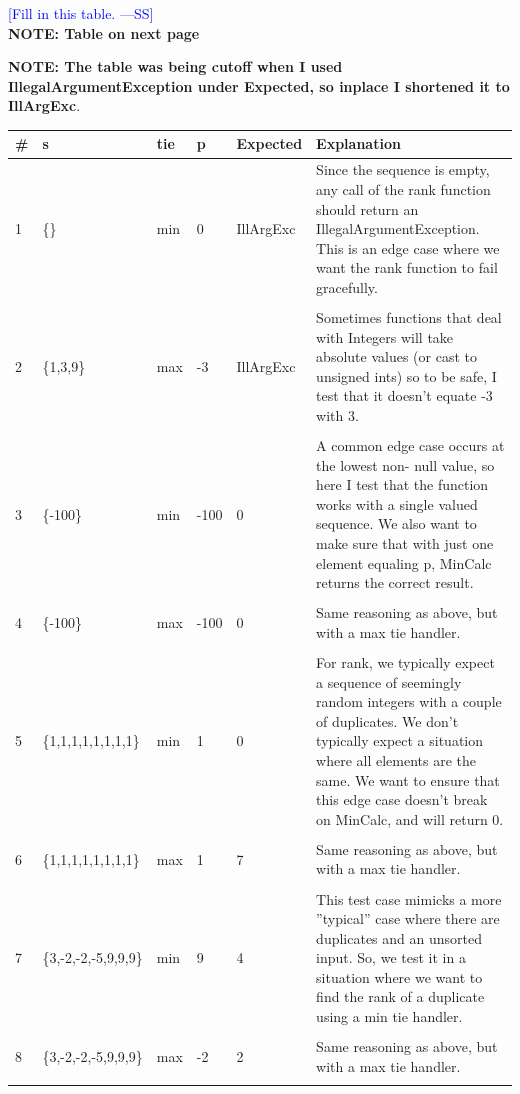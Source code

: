 \documentclass[12pt,fleqn]{examtst}
\newcommand{\authornote}[3]{\textcolor{#1}{[#3 ---#2]}}
\newcommand{\authornote}[3]{}
\newcommand{\wss}[1]{\authornote{blue}{SS}{#1}}
\begin{document}
\wss{Fill in this table.}\\

\textbf{NOTE: Table on next page}


\noindent
\begin{minipage}{\textwidth}

\textbf{NOTE: The table was being cutoff when I used IllegalArgumentException
under Expected, so inplace I shortened it to IllArgExc}.\\

\begin{tabular}{ p{0.75cm}  l  l  l  l p{9cm} }
  \toprule
  \textbf{\#} & \textbf{s} & \textbf{tie} & \textbf{p} & \textbf{Expected} & \textbf{Explanation}\\
  \midrule
  1 & \{\} & min & 0 & IllArgExc & Since the sequence is empty,
  any call of the rank function should return an IllegalArgumentException.
  This is an edge case where we want the rank function to fail gracefully.\\ \\
  2 & \{1,3,9\} & max & -3 & IllArgExc & Sometimes functions that
  deal with Integers will take absolute values (or cast to unsigned ints) so to
  be safe, I test that it doesn't equate -3 with 3.\\ \\
  3 & \{-100\} & min & -100 & 0 & A common edge case occurs at the lowest non-
  null value, so here I test that the function works with a single valued
  sequence. We also want to make sure that with just one element equaling p,
  MinCalc returns the correct result.\\ \\
  4 & \{-100\} & max & -100 & 0 & Same reasoning as above, but with a
  max tie handler.\\ \\
  5 & \{1,1,1,1,1,1,1,1\} & min & 1 & 0 & For rank, we typically expect a
  sequence of seemingly random integers with a couple of duplicates. We don't
  typically expect a situation where all elements are the same. We want to ensure
  that this edge case doesn't break on MinCalc, and will return 0.\\ \\
  6 & \{1,1,1,1,1,1,1,1\} & max & 1 & 7 & Same reasoning as above, but with a
  max tie handler.\\ \\
  7 & \{3,-2,-2,-5,9,9,9\} & min & 9 & 4 & This test case mimicks a more ''typical''
  case where there are duplicates and an unsorted input. So, we test it in a
  situation where we want to find the rank of a duplicate using a min tie handler.\\ \\
  8 & \{3,-2,-2,-5,9,9,9\} & max & -2 & 2 & Same reasoning as above, but with a
  max tie handler.\\ \\
  \bottomrule
\end{tabular}\\
\medskip
\end{minipage}
\end{document}
